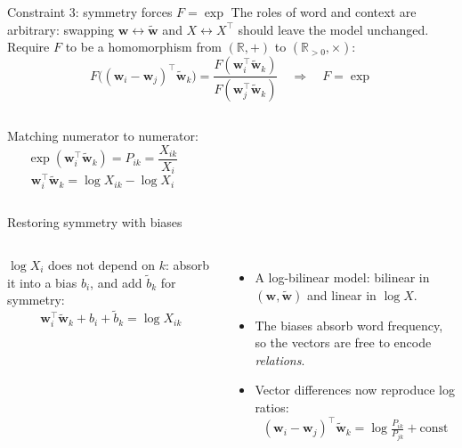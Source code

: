 \documentclass[aspectratio=169,11pt]{beamer}
\newcommand{\wv}{\mathbf{w}}
\newcommand{\cv}{\tilde{\mathbf{w}}}
\begin{document}
\begin{frame}{Constraint 3: symmetry forces $F=\exp$}
\small
The roles of word and context are arbitrary: swapping $\wv\leftrightarrow\cv$ and $X\leftrightarrow X^\top$ should leave the model unchanged.
Require $F$ to be a \alert{homomorphism} from $(\mathbb R,+)$ to $(\mathbb R_{>0},\times)$:
\[
F\big((\wv_i-\wv_j)^\top\cv_k\big)=\frac{F(\wv_i^\top\cv_k)}{F(\wv_j^\top\cv_k)}
\quad\Longrightarrow\quad F=\exp
\]
\begin{columns}[c]
Matching numerator to numerator:
\[
\exp(\wv_i^\top\cv_k)=P_{ik}=\frac{X_{ik}}{X_i}
\]
\[
\wv_i^\top\cv_k=\log X_{ik}-\log X_i
\]
\centering
{}
\end{columns}
\end{frame}

\begin{frame}{Restoring symmetry with biases}
\small
\begin{columns}[c]
$\log X_i$ does not depend on $k$: absorb it into a bias $b_i$, and add $\tilde b_k$ for symmetry:
\[
\boxed{\;\wv_i^\top\cv_k+b_i+\tilde b_k=\log X_{ik}\;}
\]
\begin{itemize}\footnotesize
  \item A \alert{log-bilinear} model: bilinear in $(\wv,\cv)$ and linear in $\log X$.
  \item The biases absorb word frequency, so the vectors are free to encode \emph{relations}.
  \item Vector differences now reproduce log ratios:
  \[(\wv_i-\wv_j)^\top\cv_k=\log\tfrac{P_{ik}}{P_{jk}}+\text{const}\]
\end{itemize}
\centering
{}
\end{columns}
\end{frame}
\end{document}
